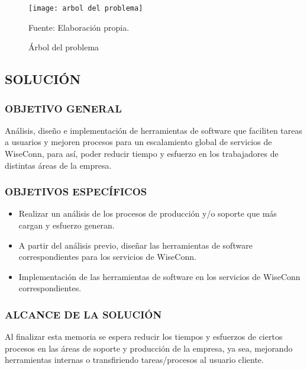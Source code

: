 \begin{figure}
    \centering
	\texttt{[image: arbol del problema]}
	\caption{\label{fig:arbolproblema} Árbol del problema} Fuente: Elaboración propia.
\end{figure}

\subsection{SOLUCIÓN}

\subsubsection{OBJETIVO GENERAL}

Análisis, diseño e implementación de herramientas de software que faciliten tareas a usuarios y mejoren procesos para un escalamiento global de servicios de WiseConn, para así, poder reducir tiempo y esfuerzo en los trabajadores de distintas áreas de la empresa.

\subsubsection{OBJETIVOS ESPECÍFICOS}
\begin{itemize}
    \item Realizar un análisis de los procesos de producción y/o soporte que más cargan y esfuerzo generan.\iffalse, como también de funcionalidades/herramientas necesarias para el plan gratuito.\fi
    \item A partir del análisis previo, diseñar las herramientas de software correspondientes para los servicios de WiseConn.
    \item Implementación de las herramientas de software en los servicios de WiseConn correspondientes.
\end{itemize}

\subsubsection{ALCANCE DE LA SOLUCIÓN}
Al finalizar esta memoria se espera reducir los tiempos y esfuerzos de ciertos procesos en las áreas de soporte y producción de la empresa, ya sea, mejorando herramientas internas o transfiriendo tareas/procesos al usuario cliente. \iffalse También, ayudar a reducir la brecha de cobros en servicios SaaS con alternativas gratuitas de ciertas funcionalidades, lo que permitiría que el plan gratuito de Wiseconn cumpla con las especificaciones comerciales.\fi
